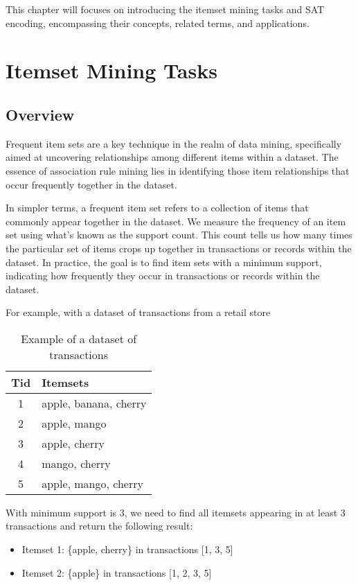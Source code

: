 This chapter will focuses on introducing the itemset mining tasks and SAT encoding, encompassing their concepts, related terms, and applications.
\section{Itemset Mining Tasks}
\subsection{Overview}
Frequent item sets are a key technique in the realm of data mining,
specifically aimed at uncovering relationships among different items within a dataset.
The essence of association rule mining lies in identifying those item relationships that occur frequently together in the dataset.

In simpler terms, a frequent item set refers to a collection of items that commonly appear together in the dataset.
We measure the frequency of an item set using what's known as the support count.
This count tells us how many times the particular set of items crops up together in transactions or records within the dataset.
In practice, the goal is to find item sets with a minimum support, indicating how frequently they occur in transactions or records within the dataset.

For example, with a dataset of transactions from a retail store
\begin{table}[H]
    \centering
    \begin{tabular}{|c|l|}
        \hline
        \textbf{Tid} & \textbf{Itemsets}     \\
        \hline
        1            & apple, banana, cherry \\
        2            & apple, mango          \\
        3            & apple, cherry         \\
        4            & mango, cherry         \\
        5            & apple, mango, cherry  \\
        \hline
    \end{tabular}
    \caption{Example of a dataset of transactions}
    \label{tab:example_dataset_in_real}
\end{table}

With minimum support is 3, we need to find all itemsets appearing in at least 3 transactions and return the following result:

\begin{itemize}
    \item Itemset 1: \{apple, cherry\} in transactions [1, 3, 5]
    \item Itemset 2: \{apple\} in transactions [1, 2, 3, 5]

\end{itemize}

